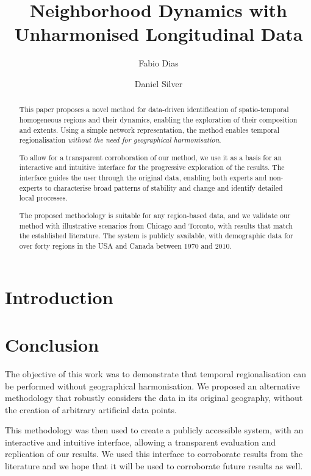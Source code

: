 \documentclass[10pt,letterpaper]{article}
\title{Neighborhood Dynamics with Unharmonised Longitudinal Data}
\author[1]{Fabio Dias}
\author[2]{Daniel Silver}
\affil[1]{Department of Mechanical \& Industrial Engineering, University of Toronto, Toronto, Canada.}
\affil[2]{Department of Sociology, University of Toronto, Toronto, Canada.}
\date{}
\begin{document}
\maketitle


\begin{abstract}
  This paper proposes a novel method for data-driven
  identification of spatio-temporal homogeneous regions and their dynamics,
  enabling the exploration of their composition and extents.  Using a simple
  network representation, the method enables temporal regionalisation
  \emph{without the need for geographical harmonisation}.
    
  To allow for a transparent corroboration of our method, we use it as a basis
  for an interactive and intuitive interface for the progressive exploration of
  the results. The interface guides the user through the original data, enabling
  both experts and non-experts to characterise broad patterns of stability and
  change and identify detailed local processes.

  
  The proposed methodology is suitable for any region-based data, and we
  validate our method with illustrative scenarios from Chicago and Toronto, with
  results that match the established literature. The system is publicly
  available, with demographic data for over forty regions in the USA and Canada
  between 1970 and 2010.
\end{abstract}

\section{Introduction}\label{sec:introduction}












\section{Conclusion}
The objective of this work was to demonstrate that temporal
regionalisation can be performed without geographical harmonisation. We
proposed an alternative methodology that robustly considers the data in its
original geography, without the creation of arbitrary artificial data points.

This methodology was then used to create a publicly accessible system, with an
interactive and intuitive interface, allowing a transparent evaluation and
replication of our results. We used this interface to corroborate results from
the literature and we hope that it will be used to corroborate future results as
well. 
\end{document}

